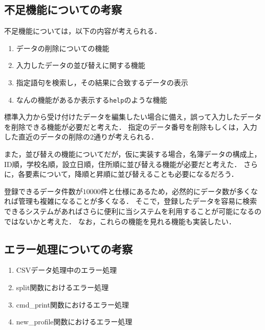 \documentclass[a4j,11pt]{jarticle}
\begin{document}
\subsection{不足機能についての考察}
不足機能については，以下の内容が考えられる．
\begin{enumerate}
\setlength{\parskip}{2pt} \setlength{\itemsep}{2pt}
    \item データの削除についての機能
    \item 入力したデータの並び替えに関する機能
　　\item 指定語句を検索し，その結果に合致するデータの表示
　　\item なんの機能があるか表示する\verb|help|のような機能
\end{enumerate}
標準入力から受け付けたデータを編集したい場合に備え，誤って入力したデータを削除できる機能が必要だと考えた．
指定のデータ番号を削除もしくは，入力した直近のデータの削除の2通りが考えられる．

また，並び替えの機能についてだが，仮に実装する場合，名簿データの構成上，ID順，学校名順，設立日順，住所順に並び替える機能が必要だと考えた．
さらに，各要素について，降順と昇順に並び替えることも必要になるだろう．

登録できるデータ件数が$10000$件と仕様にあるため，必然的にデータ数が多くなれば管理も複雑になることが多くなる．
そこで，登録したデータを容易に検索できるシステムがあればさらに便利に当システムを利用することが可能になるのではないかと考えた．
なお，これらの機能を見れる機能も実装したい．

\subsection{エラー処理についての考察}
\begin{enumerate}
\setlength{\parskip}{2pt} \setlength{\itemsep}{2pt}
    \item CSVデータ処理中のエラー処理
    \item split関数におけるエラー処理
　　\item cmd\_print関数におけるエラー処理
    \item new\_profile関数におけるエラー処理
\end{enumerate}


\end{document}
